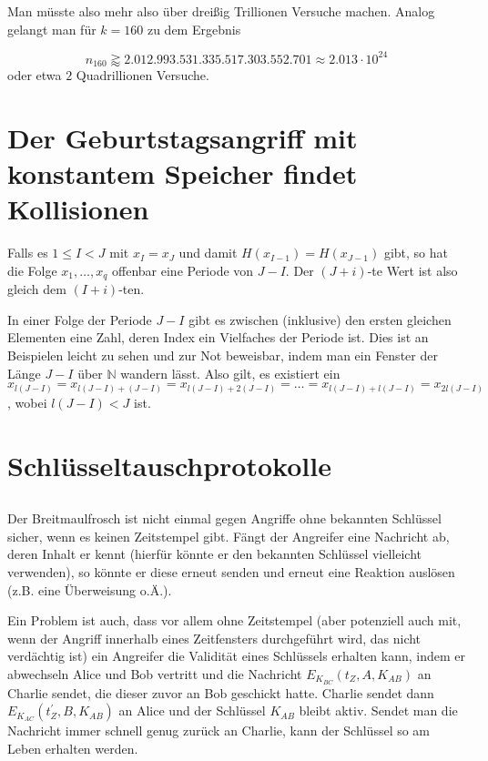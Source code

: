 \documentclass{../crypto}
\begin{document}
Man müsste also mehr also über dreißig Trillionen
Versuche machen. Analog gelangt man für $k=160$ zu dem Ergebnis 

\begin{equation*}
   n_{160} \gtrapprox 2.012.993.531.335.517.303.552.701 \approx 2.013 \cdot 10^{24}
\end{equation*}
oder etwa $2$ Quadrillionen Versuche.

\section{Der Geburtstagsangriff mit konstantem Speicher findet Kollisionen}

Falls es $1 \le I < J$ mit $x_I = x_J$ und damit $H(x_{I-1}) = H(x_{J-1})$
gibt, so hat die Folge $x_1,\ldots,x_q$ offenbar eine Periode von $J - I$. Der
$(J+i)$-te Wert ist also gleich dem $(I+i)$-ten. 

In einer Folge der Periode $J-I$ gibt es zwischen (inklusive) den ersten
gleichen Elementen eine Zahl, deren Index ein Vielfaches der Periode ist. Dies
ist an Beispielen leicht zu sehen und zur Not beweisbar, indem man ein Fenster
der Länge $J-I$ über $\mathbb{N}$ wandern lässt. Also
gilt, es existiert ein $x_{l(J-I)} = x_{l(J-I) + (J-I)} = x_{l(J-I) + 2(J-I)} =
\ldots = x_{l(J-I) + l(J-I)} = x_{2l(J-I)}$, wobei $l(J-I) < J$ ist.

\section{Schlüsseltauschprotokolle}
\subsection{}

Der Breitmaulfrosch ist nicht einmal gegen Angriffe ohne bekannten Schlüssel
sicher, wenn es keinen Zeitstempel gibt. Fängt der Angreifer eine Nachricht ab,
deren Inhalt er kennt (hierfür könnte er den bekannten Schlüssel vielleicht
verwenden), so könnte er diese erneut senden und erneut eine Reaktion auslösen
(z.B. eine Überweisung o.Ä.). 

Ein Problem ist auch, dass vor allem ohne Zeitstempel (aber potenziell auch mit,
wenn der Angriff innerhalb eines Zeitfensters durchgeführt wird, das nicht
verdächtig ist) ein Angreifer die Validität eines Schlüssels erhalten kann,
indem er abwechseln Alice und Bob vertritt und die Nachricht
$E_{K_{BC}}(t_Z, A, K_{AB})$ an Charlie sendet, die dieser zuvor an Bob
geschickt hatte. Charlie sendet dann $E_{K_{AC}}(t_Z^\prime, B, K_{AB})$ an
Alice und der Schlüssel $K_{AB}$ bleibt aktiv. Sendet man die Nachricht immer
schnell genug zurück an Charlie, kann der Schlüssel so am Leben erhalten werden.
\end{document}
